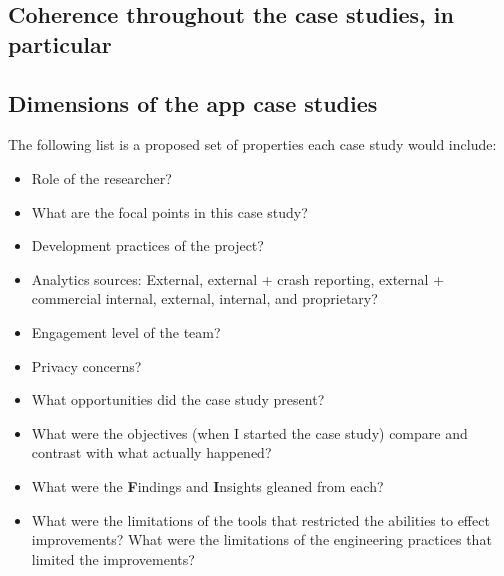 \subsection{Coherence throughout the case studies, in particular}


\subsection{Dimensions of the app case studies}
The following list is a proposed set of properties each case study would include:
{\small
\begin{itemize}
    \itemsep0em
    \item Role of the researcher?
    \item What are the focal points in this case study?
    \item Development practices of the project?
    \item Analytics sources: External, external + crash reporting, external + commercial internal, external, internal, and proprietary?
    \item Engagement level of the team?
    \item Privacy concerns?
    \item What opportunities did the case study present?
    \item What were the objectives (when I started the case study) compare and contrast with what actually happened? 
    \item What were the \textbf{F}indings and \textbf{I}nsights gleaned from each?
    \item What were the limitations of the tools that restricted the abilities to effect improvements? What were the limitations of the engineering practices that limited the improvements?
\end{itemize}
}

